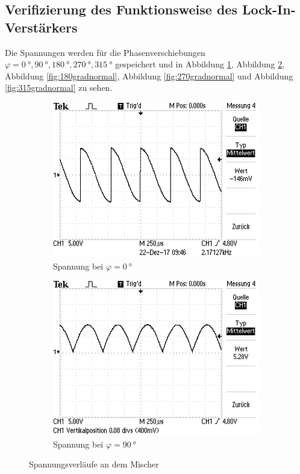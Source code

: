 \subsection{Verifizierung des Funktionsweise des Lock-In-Verstärkers}
Die Spannungen werden für die Phasenverschiebungen $\varphi= \SI{0}{°}, \SI{90}{°}, \SI{180}{°}, \SI{270}{°}, \SI{315}{°}$ gespeichert und in Abbildung \ref{fig:0gradnormal},
Abbildung \ref{fig:90gradnormal}, Abbildung \ref{fig:180gradnormal}, Abbildung \ref{fig:270gradnormal} und Abbildung \ref{fig:315gradnormal} zu sehen.
\FloatBarrier
\begin{figure}[h!]
 \centering
 \begin{subfigure}{0.48\textwidth}
  \centering
  \includegraphics[width=\textwidth]{0gradnormal.JPG}
  \caption{Spannung bei $\varphi=\SI{0}{°}$}
  \label{fig:0gradnormal}
 \end{subfigure}
 \begin{subfigure}{0.48\textwidth}
  \centering
  \includegraphics[width=\textwidth]{90gradnormal.JPG}
  \caption{Spannung bei $\varphi=\SI{90}{°}$}
  \label{fig:90gradnormal}
 \end{subfigure}
 \caption{Spannungsverläufe an dem Mischer}
 \label{fig:000090}
\end{figure}
